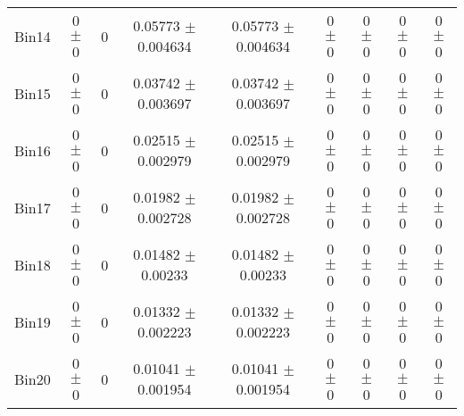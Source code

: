 \begin{tabular}{@{\extracolsep{4pt}}lcccccccc@{}}
     Bin14 & 0 $\pm$ 0 & 0 & 0.05773 $\pm$ 0.004634 & 0.05773 $\pm$ 0.004634 & 0 $\pm$ 0 & 0 $\pm$ 0 & 0 $\pm$ 0 & 0 $\pm$ 0 \\ 
     Bin15 & 0 $\pm$ 0 & 0 & 0.03742 $\pm$ 0.003697 & 0.03742 $\pm$ 0.003697 & 0 $\pm$ 0 & 0 $\pm$ 0 & 0 $\pm$ 0 & 0 $\pm$ 0 \\ 
     Bin16 & 0 $\pm$ 0 & 0 & 0.02515 $\pm$ 0.002979 & 0.02515 $\pm$ 0.002979 & 0 $\pm$ 0 & 0 $\pm$ 0 & 0 $\pm$ 0 & 0 $\pm$ 0 \\ 
     Bin17 & 0 $\pm$ 0 & 0 & 0.01982 $\pm$ 0.002728 & 0.01982 $\pm$ 0.002728 & 0 $\pm$ 0 & 0 $\pm$ 0 & 0 $\pm$ 0 & 0 $\pm$ 0 \\ 
     Bin18 & 0 $\pm$ 0 & 0 & 0.01482 $\pm$ 0.00233 & 0.01482 $\pm$ 0.00233 & 0 $\pm$ 0 & 0 $\pm$ 0 & 0 $\pm$ 0 & 0 $\pm$ 0 \\ 
     Bin19 & 0 $\pm$ 0 & 0 & 0.01332 $\pm$ 0.002223 & 0.01332 $\pm$ 0.002223 & 0 $\pm$ 0 & 0 $\pm$ 0 & 0 $\pm$ 0 & 0 $\pm$ 0 \\ 
     Bin20 & 0 $\pm$ 0 & 0 & 0.01041 $\pm$ 0.001954 & 0.01041 $\pm$ 0.001954 & 0 $\pm$ 0 & 0 $\pm$ 0 & 0 $\pm$ 0 & 0 $\pm$ 0 \\ 
\hline\hline
  \end{tabular}
